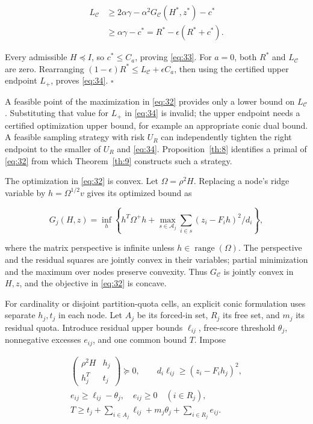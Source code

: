 \documentclass[11pt]{article}
\begin{document}
\[
\begin{aligned}
L_{\mathcal C}
&\ge2\alpha\gamma-\alpha^2G_{\mathcal C}(H^*,z^*)-c^*\\
&\ge\alpha\gamma-c^*
=R^*-\epsilon(R^*+c^*).
\end{aligned}
\]

Every admissible \(H\preceq I\), so \(c^*\le C_a\), proving
\eqref{eq:33}. For \(a=0\), both \(R^*\) and \(L_{\mathcal C}\) are
zero. Rearranging \((1-\epsilon)R^*\le L_{\mathcal C}+\epsilon C_a\),
then using the certified upper endpoint \(L_+\), proves \eqref{eq:34}.
\(\square\)

A feasible point of the maximization in \eqref{eq:32} provides only a
lower bound on \(L_{\mathcal C}\). Substituting that value for \(L_+\)
in \eqref{eq:34} is invalid; the upper endpoint needs a certified
optimization upper bound, for example an appropriate conic dual bound. A
feasible sampling strategy with risk \(U_R\) can independently tighten
the right endpoint to the smaller of \(U_R\) and \eqref{eq:34}.
Proposition~\ref{th:8} identifies a primal of
\eqref{eq:32} from which Theorem~\ref{th:9} constructs
such a strategy.

The optimization in \eqref{eq:32} is convex. Let \(\Omega=\rho^2H\).
Replacing a node's ridge variable by \(h=\Omega^{1/2}v\) gives its
optimized bound as

\[
G_j(H,z)=\inf_h\left\{h^T\Omega^+h+
\max_{s\in\mathcal A_j}\sum_{i\in s}(z_i-F_ih)^2/d_i\right\},
\]

where the matrix perspective is infinite unless
\(h\in\operatorname{range}(\Omega)\). The perspective and the residual
squares are jointly convex in their variables; partial minimization and
the maximum over nodes preserve convexity. Thus \(G_{\mathcal C}\) is
jointly convex in \(H,z\), and the objective in \eqref{eq:32} is
concave.

For cardinality or disjoint partition-quota cells, an explicit conic
formulation uses separate \(h_j,t_j\) in each node. Let \(A_j\) be its
forced-in set, \(R_j\) its free set, and \(m_j\) its residual quota.
Introduce residual upper bounds \(\ell_{ij}\), free-score threshold
\(\theta_j\), nonnegative excesses \(e_{ij}\), and one common bound
\(T\). Impose

\begin{equation}\label{eq:35}
\begin{gathered}
\begin{pmatrix}\rho^2H&h_j\\h_j^T&t_j\end{pmatrix}\succeq0,
\qquad d_i\ell_{ij}\ge(z_i-F_ih_j)^2,\\
e_{ij}\ge\ell_{ij}-\theta_j,\quad e_{ij}\ge0\quad(i\in R_j),\\
T\ge t_j+\sum_{i\in A_j}\ell_{ij}
+m_j\theta_j+\sum_{i\in R_j}e_{ij}.
\end{gathered} 
\end{equation}
\end{document}

